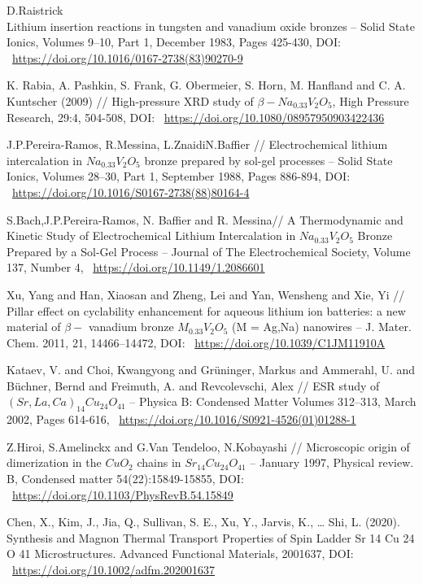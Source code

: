 \documentclass[11pt]{article}
\begin{document}
\begin{thebibliography}{3}
D.Raistrick \\ Lithium insertion reactions in tungsten and vanadium oxide bronzes -- Solid State Ionics, Volumes 9–10, Part 1, December 1983, Pages 425-430, DOI: ~\url{https://doi.org/10.1016/0167-2738(83)90270-9}

K. Rabia, A. Pashkin, S. Frank, G. Obermeier, S. Horn, M. Hanfland and C. A. Kuntscher (2009) // High-pressure XRD study of $\beta-Na_{0.33}V_2O_5$, High Pressure Research, 29:4, 504-508, DOI: ~\url{https://doi.org/10.1080/08957950903422436}

J.P.Pereira-Ramos, R.Messina, L.ZnaidiN.Baffier // Electrochemical lithium intercalation in $Na_{0.33}V_2O_5$ bronze prepared by sol-gel processes -- Solid State Ionics, Volumes 28–30, Part 1, September 1988, Pages 886-894, DOI: ~\url{https://doi.org/10.1016/S0167-2738(88)80164-4}

S.Bach,J.P.Pereira-Ramos, N. Baffier and R. Messina// A Thermodynamic and Kinetic Study of Electrochemical Lithium Intercalation in $Na_{0.33}V_2O_5$ Bronze Prepared by a Sol-Gel Process -- Journal of The Electrochemical Society, Volume 137, Number 4, ~\url{https://doi.org/10.1149/1.2086601}

Xu, Yang and Han, Xiaosan and Zheng, Lei and Yan, Wensheng and Xie, Yi // Pillar effect on cyclability enhancement for aqueous lithium ion batteries: a new material of $\beta - $ vanadium bronze $M_{0.33}V_2O_5$ (M = Ag,Na) nanowires -- J. Mater. Chem. 2011, 21, 14466–14472, DOI: ~\url{https://doi.org/10.1039/C1JM11910A}

Kataev, V. and Choi, Kwangyong and Grüninger, Markus and Ammerahl, U. and Büchner, Bernd and Freimuth, A. and Revcolevschi, Alex // ESR study of $(Sr,La,Ca)_{14}Cu_{24}O_{41}$ -- Physica B: Condensed Matter Volumes 312–313, March 2002, Pages 614-616,  ~\url{https://doi.org/10.1016/S0921-4526(01)01288-1}

Z.Hiroi, S.Amelinckx and G.Van Tendeloo, N.Kobayashi // Microscopic origin of dimerization in the $CuO_2$ chains in $Sr_{14}Cu_{24}O_{41}$ -- January 1997, Physical review. B, Condensed matter 54(22):15849-15855, DOI: ~\url{https://doi.org/10.1103/PhysRevB.54.15849} 

Chen, X., Kim, J., Jia, Q., Sullivan, S. E., Xu, Y., Jarvis, K., … Shi, L. (2020). Synthesis and Magnon Thermal Transport Properties of Spin Ladder Sr 14 Cu 24 O 41 Microstructures. Advanced Functional Materials, 2001637, DOI: ~\url{https://doi.org/10.1002/adfm.202001637}


\end{thebibliography}
\end{document}
